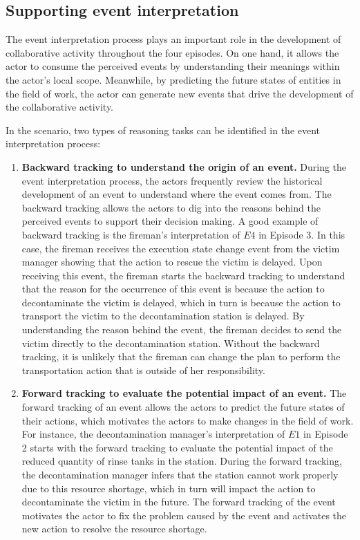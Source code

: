 \subsection{Supporting event interpretation} %
\label{sub:supporting_event_interpretation}
The event interpretation process plays an important role in the development of collaborative activity throughout the four episodes. On one hand, it allows the actor to consume the perceived events by understanding their meanings within the actor's local scope. Meanwhile, by predicting the future states of entities in the field of work, the actor can generate new events that drive the development of the collaborative activity. 

In the scenario, two types of reasoning tasks can be identified in the event interpretation process:

\begin{enumerate}
	\item \textbf{Backward tracking to understand the origin of an event.} During the event interpretation process, the actors frequently review the historical development of an event to understand where the event comes from. The backward tracking allows the actors to dig into the reasons behind the perceived events to support their decision making. A good example of backward tracking is the fireman's interpretation of $E4$ in Episode 3. In this case, the fireman receives the execution state change event from the victim manager showing that the action to rescue the victim is delayed. Upon receiving this event, the fireman starts the backward tracking to understand that the reason for the occurrence of this event is because the action to decontaminate the victim is delayed, which in turn is because the action to transport the victim to the decontamination station is delayed. By understanding the reason behind the event, the fireman decides to send the victim directly to the decontamination station. Without the backward tracking, it is unlikely that the fireman can change the plan to perform the transportation action that is outside of her responsibility.
	\item \textbf{Forward tracking to evaluate the potential impact of an event.} The forward tracking of an event allows the actors to predict the future states of their actions, which motivates the actors to make changes in the field of work. For instance, the decontamination manager's interpretation of $E1$ in Episode 2 starts with the forward tracking to evaluate the potential impact of the reduced quantity of rinse tanks in the station. During the forward tracking, the decontamination manager infers that the station cannot work properly due to this resource shortage, which in turn will impact the action to decontaminate the victim in the future. The forward tracking of the event motivates the actor to fix the problem caused by the event and activates the new action to resolve the resource shortage.
\end{enumerate}

